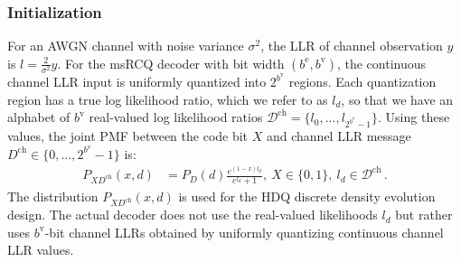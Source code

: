 \documentclass [PhD] {uclathes}
\begin{document}
\subsubsection{Initialization}
For an AWGN channel with noise variance $\sigma^2$, the LLR of channel observation $y$ is $l=\frac{2}{\sigma^2}y$.
For the msRCQ decoder with bit width $(b^\text{e},b^\text{v})$, the continuous channel LLR input is uniformly quantized into $2^{b^\text{v}}$ regions.  Each quantization region has a true log likelihood ratio, which we refer to as $l_d$, so that we have an alphabet of $b^\text{v}$ real-valued log likelihood ratios ${\mathcal D}^{\text{ch}}=\{l_0,...,l_{2^{b^{\text{v}}}-1}\}$.  Using these values, the joint PMF between the code bit $X$ and channel LLR message $D^{\text{ch}} \in \{0,...,{2^{b^{\text{v}}}-1}\}$ is:
\begin{align}\label{equ: chan_prob}
    P_{XD^{\text{ch}}}(x,d) &= P_D(d) \frac{e^{(1-x)l_d}}{e^{l_d}+1}, ~X\in \{0,1\},\  l_d\in {\mathcal D}^{\text{ch}}\, .
\end{align}
The distribution $P_{XD^{\text{ch}}}(x,d)$ is used for the HDQ discrete density evolution design.  The actual decoder does not use the real-valued likelihoods $l_d$ but rather uses $b^{\text{v}}$-bit channel LLRs obtained by uniformly quantizing continuous channel LLR values.
\end{document}
